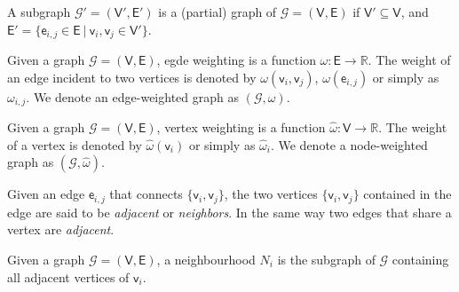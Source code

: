 \begin{definition}[Subgraph]
	A subgraph $\mathcal{G}'= (\mathsf{V}', \mathsf{E}')$ is a (partial) graph of $\mathcal{G}=(\mathsf{V}, \mathsf{E})$ if $\mathsf{V}' \subseteq \mathsf{V}$, and  $\mathsf{E}'= \{\mathsf{e}_{i,j} \in \mathsf{E}\ |\ \mathsf{v}_i,\mathsf{v}_j \in \mathsf{V}' \}$.
\end{definition}

\begin{definition}
	Given a graph $\mathcal{G}=(\mathsf{V}, \mathsf{E})$, egde weighting is a function $\omega: \mathsf{E} \rightarrow \mathbb{R}$. The weight of an edge incident to two vertices is denoted by  $\omega(\mathsf{v}_{i}, \mathsf{v}_{j})$, $ \omega(\mathsf{e}_{i,j})$ or simply as $\omega_{i,j}$. We denote an edge-weighted graph as $(\mathcal{G}, \omega)$.
\end{definition}

\begin{definition}
	Given a graph $\mathcal{G}=(\mathsf{V}, \mathsf{E})$, vertex weighting is a function $\hat{\omega}: \mathsf{V} \rightarrow \mathbb{R}$. The weight of a vertex is denoted by  $\hat{\omega}(\mathsf{v}_{i})$ or simply as $\hat{\omega}_{i}$. We denote a node-weighted graph as $(\mathcal{G}, \hat{\omega})$.
\end{definition}

\begin{definition}[Adjacency]
	Given an edge $\mathsf{e}_{i,j}$ that connects $\{\mathsf{v}_{i}, \mathsf{v}_{j}\} $, the two vertices $\{\mathsf{v}_{i}, \mathsf{v}_{j}\}$ contained in the edge are said to be \textit{adjacent} or \textit{neighbors}. In the same way two edges that share a vertex are \textit{adjacent}.
\end{definition}

\begin{definition}[Neighborhood]
	Given a graph $\mathcal{G}=(\mathsf{V}, \mathsf{E})$, a neighbourhood $N_i$ is the subgraph of $\mathcal{G}$ containing all adjacent vertices of $\mathsf{v}_i$.
\end{definition}

